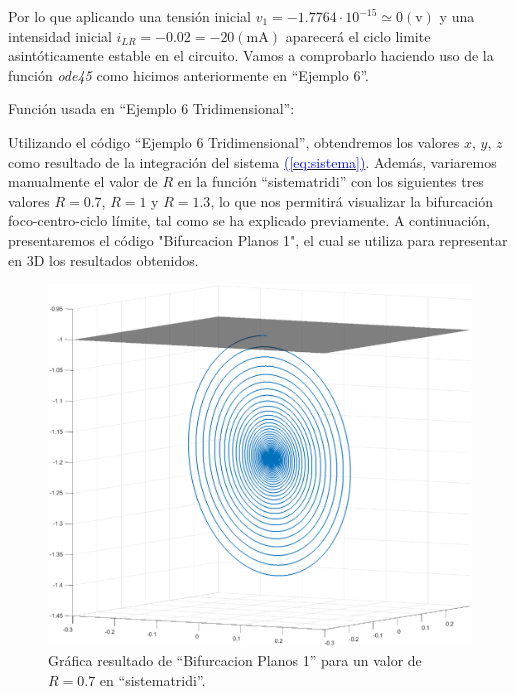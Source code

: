 \documentclass[12pt,a4paper]{report} %
\newcommand{\eref}[1]{\hyperref[#1]{\textcolor{blue}{(\ref*{#1})}}}
\begin{document}
	\vspace{0.4cm}\noindent Por lo que aplicando una tensión inicial $v_1=-1.7764\cdotp 10^{-15} \simeq 0 (\text{v})$ y una intensidad inicial $i_{LR}=-0.02=-20(\text{mA})$ aparecerá el ciclo limite asintóticamente estable en el circuito. Vamos a comprobarlo haciendo uso de la función \textit{ode45} como hicimos anteriormente en ``Ejemplo 6''.
	
	\vspace{0.5cm}
	
	\vspace{0.5cm}\noindent Función usada en ``Ejemplo 6 Tridimensional'':
	\vspace{0.5cm}
	
	\newpage
	
	 Utilizando el código ``Ejemplo 6 Tridimensional'', obtendremos los valores $x$, $y$, $z$ como resultado de la integración del sistema \eref{eq:sistema}. Además, variaremos manualmente el valor de $R$ en la función ``sistematridi'' con los siguientes tres valores $R=0.7$, $R=1$ y $R=1.3$, lo que nos permitirá visualizar la bifurcación foco-centro-ciclo límite, tal como se ha explicado previamente. A continuación, presentaremos el código "Bifurcacion Planos 1", el cual se utiliza para representar en 3D los resultados obtenidos.
	
	\vspace{0.5cm}
	
	\newpage
	
	\begin{figure}[h]
		\centering
		\includegraphics[width=1\textwidth]{fococir.eps}
		\caption{Gráfica resultado de ``Bifurcacion Planos 1'' para un valor de $R=0.7$ en ``sistematridi''.}
		\label{fig:fococircuito}
	\end{figure}\smallskip
	
\end{document}
